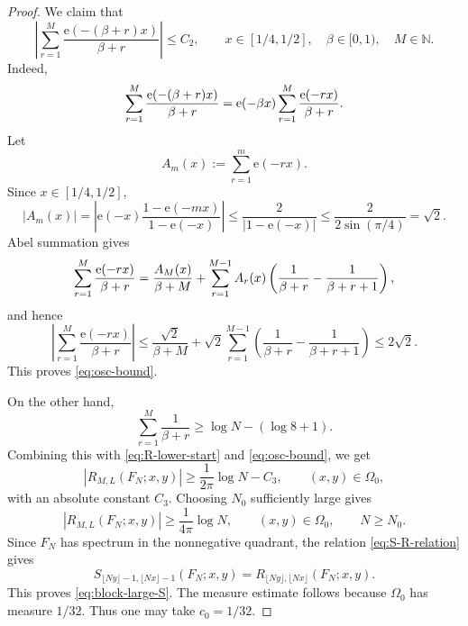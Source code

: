 \documentclass[11pt]{amsart}
\numberwithin{equation}{section}
\begin{document}
\begin{proof}
We claim that 
\begin{equation}  \label{eq:osc-bound}
\left|\sum_{r=1}^{M}\frac{\mathrm{e}\!\left(-(\beta+r)x\right)}{\beta+r}%
\right| \le C_2, \qquad x\in[1/4,1/2],\quad \beta\in[0,1),\quad M\in\mathbb{N%
}.
\end{equation}
Indeed, 
\begin{equation*}
\sum_{r=1}^{M}\frac{\mathrm{e}\!\left(-(\beta+r)x\right)}{\beta+r} =\mathrm{e%
}\!\left(-\beta x\right)\sum_{r=1}^{M}\frac{\mathrm{e}\!\left(-rx\right)}{%
\beta+r}.
\end{equation*}
Let 
\begin{equation*}
A_m(x):=\sum_{r=1}^{m}\mathrm{e}\!\left(-rx\right).
\end{equation*}
Since $x\in[1/4,1/2]$, 
\begin{equation*}
\left|A_m(x)\right| =\left|\mathrm{e}\!\left(-x\right)\frac{1-\mathrm{e}%
\!\left(-mx\right)}{1-\mathrm{e}\!\left(-x\right)}\right| \le \frac2{\left|1-%
\mathrm{e}\!\left(-x\right)\right|} \le \frac2{2\sin(\pi/4)}=\sqrt2.
\end{equation*}
Abel summation gives 
\begin{equation*}
\sum_{r=1}^{M}\frac{\mathrm{e}\!\left(-rx\right)}{\beta+r} =\frac{A_M(x)}{%
\beta+M} +\sum_{r=1}^{M-1} A_r(x)
\left(\frac1{\beta+r}-\frac1{\beta+r+1}\right),
\end{equation*}
and hence 
\begin{equation*}
\left|\sum_{r=1}^{M}\frac{\mathrm{e}\!\left(-rx\right)}{\beta+r}\right| \le 
\frac{\sqrt2}{\beta+M} +\sqrt2\sum_{r=1}^{M-1}
\left(\frac1{\beta+r}-\frac1{\beta+r+1}\right) \le 2\sqrt2.
\end{equation*}
This proves \eqref{eq:osc-bound}.

On the other hand, 
\begin{equation*}
\sum_{r=1}^{M}\frac{1}{\beta +r}\geq \log N-(\log 8+1).
\end{equation*}%
Combining this with \eqref{eq:R-lower-start} and \eqref{eq:osc-bound}, we
get 
\begin{equation*}
\left\vert R_{M,L}(F_{N};x,y)\right\vert \geq \frac{1}{2\pi }\log
N-C_{3},\qquad (x,y)\in \Omega _{0},
\end{equation*}%
with an absolute constant $C_{3}$. Choosing $N_0$ sufficiently large gives 
\begin{equation*}
\left|R_{M,L}(F_N;x,y)\right| \ge \frac{1}{4\pi}\log N, \qquad
(x,y)\in\Omega_0, \qquad N\ge N_0.
\end{equation*}
Since $F_N$ has spectrum in the nonnegative quadrant, the relation %
\eqref{eq:S-R-relation} gives 
\begin{equation*}
S_{\lfloor Ny\rfloor-1,\lfloor Nx\rfloor-1}(F_N;x,y) =R_{\lfloor
Ny\rfloor,\lfloor Nx\rfloor}(F_N;x,y).
\end{equation*}
This proves \eqref{eq:block-large-S}. The measure estimate follows because $%
\Omega_0$ has measure $1/32$. Thus one may take $c_0=1/32$.
\end{proof}
\end{document}

